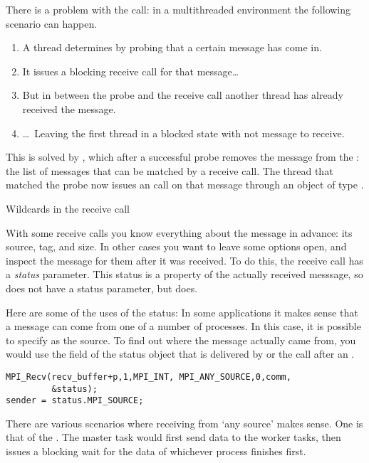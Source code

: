 There is a problem with the  call: in a
multithreaded environment the following scenario can happen.
\begin{enumerate}
\item A thread determines by probing that a certain message has come
  in.
\item It issues a blocking receive call for that message\dots
\item But in between the probe and the receive call another thread
  has already received the message.
\item \dots~Leaving the first thread in a blocked state with not
  message to receive.
\end{enumerate}
This is solved by , which after a successful
probe removes the message from the : the
list of messages that can be matched by a receive call. The thread
that matched the probe now issues an  call on
that message through an object of type .



 {Wildcards in the receive call}
\label{sec:mpi-status}

With some receive calls you know everything about the message in advance:
its source, tag, and size. In other cases you want to leave some options
open, and inspect the message for them after it was received.
To do this, the receive call has a \emph{status}
parameter.
This status is a property of the actually received messsage, so 
does not have a status parameter, but  does.

Here are some of the uses of the status:
 In some applications it makes sense that a message can come from 
one of a number of processes. In this case, it is possible to specify
 as the source. To find out where the message actually
came from, you would use the  field of the status object
that is delivered by  or the  call after an .
\begin{verbatim}
MPI_Recv(recv_buffer+p,1,MPI_INT, MPI_ANY_SOURCE,0,comm,
         &status);
sender = status.MPI_SOURCE;
\end{verbatim}

There are various scenarios where receiving from `any source' makes sense.
One is that of the . The master task would first send
data to the worker tasks, then issues a blocking wait for the data of whichever process
finishes first.

